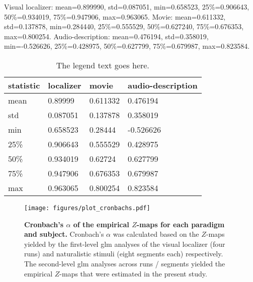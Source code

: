 
Visual localizer:  mean=0.899990, std=0.087051, min=0.658523,
25\%=0.906643, 50\%=0.934019, 75\%=0.947906, max=0.963065.
%
Movie: mean=0.611332, std=0.137878, min=0.284440,
25\%=0.555529, 50\%=0.627240, 75\%=0.676353, max=0.800254.
%
Audio-description: mean=0.476194, std=0.358019, min=-0.526626,
25\%=0.428975, 50\%=0.627799, 75\%=0.679987, max=0.823584.


\begin{table*}[btp]
\centering
    \caption{
    \textbf{Descriptive statistics of Cronbach's $\alpha$ across subjects.}
    Imo, not super necessary to provide these numbers. Stripplot + boxplots
    could be sufficient. If table is supposed to be kept, round the numbers,
    write a good description for the table.}
\label{tab:cronbachs}
\begin{tabular}{llll}
    \toprule
    \textbf{statistic} & \textbf{localizer} & \textbf{movie} & \textbf{audio-description} \\
    \midrule
    mean & 0.89999 & 0.611332 & 0.476194 \tabularnewline
    std & 0.087051 & 0.137878 & 0.358019 \tabularnewline
    min & 0.658523 & 0.28444 & -0.526626 \tabularnewline
    25\% & 0.906643 & 0.555529 & 0.428975 \tabularnewline
    50\% & 0.934019 & 0.62724 & 0.627799 \tabularnewline
    75\% & 0.947906 & 0.676353 & 0.679987 \tabularnewline
    max & 0.963065 & 0.800254 & 0.823584 \tabularnewline
    \bottomrule
\end{tabular}
\caption*{The legend text goes here.}
\end{table*}


\begin{figure*}[tbp] \centering
    \texttt{[image: figures/plot\_cronbachs.pdf]}
    \caption{\textbf{Cronbach's $\alpha$ of the empirical $Z$-maps for each
    paradigm and subject.}
    Cronbach's $\alpha$ was calculated based on the $Z$-maps yielded by the
    first-level \ac{glm} analyses of the visual localizer
    \citep{sengupta2016extension} (four runs) and naturalistic stimuli
    \citep{haeusler2022processing} (eight segments each) respectively.
    The second-level \ac{glm} analyses across runs / segments yielded the
    empirical $Z$-maps that were estimated in the present study.
    }
    \label{fig:cronbachs}
\end{figure*}



\pagebreak



